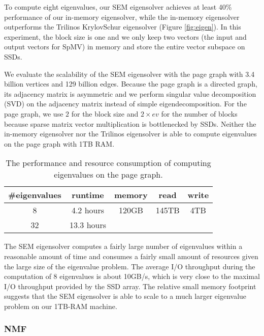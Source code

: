 To compute eight eigenvalues, our SEM eigensolver achieves at least 40\%
performance of our in-memory eigensolver, while the in-memory eigensolver
outperforms the Trilinos KrylovSchur eigensolver (Figure \ref{fig:eigen}).
In this experiment, the block size is one and we only keep two vectors
(the input and output vectors for SpMV) in memory and store the entire
vector subspace on SSDs.


%		

We evaluate the scalability of the SEM eigensolver with the page graph with 3.4 billion
vertices and 129 billion edges. Because the page graph is a directed graph,
its adjacency matrix is asymmetric and we perform singular value decomposition
(SVD) on the adjacency matrix instead of simple eigendecomposition. For the page
graph, we use $2$ for the block size and $2 \times ev$ for the number of blocks
because sparse matrix vector multiplication is bottlenecked by SSDs.
Neither the in-memory eigensolver nor the Trilinos eigensolver is able
to compute eigenvalues on the page graph with 1TB RAM.

\begin{table}
	\begin{center}
		\small
		\begin{tabular}{|c|c|c|c|c|}
			\hline
			\#eigenvalues & runtime & memory & read & write \\
			\hline
			8 & 4.2 hours & 120GB & 145TB & 4TB \\
			\hline
			32 & 13.3 hours &  &  & \\
			\hline
		\end{tabular}
		\normalsize
	\end{center}
	\caption{The performance and resource consumption of computing eigenvalues
	on the page graph.}
	\label{pg_ev}
\end{table}

The SEM eigensolver computes a fairly large number of eigenvalues within a reasonable
amount of time and consumes a fairly small amount of resources given the large
size of the eigenvalue problem.
The average I/O throughput during the computation of 8 eigenvalues is about
10GB/s, which is very close to the maximal I/O throughput provided by
the SSD array. The relative small memory footprint suggests that the SEM
eigensolver is able to scale to a much larger eigenvalue problem on our
1TB-RAM machine.

\subsubsection{NMF}

